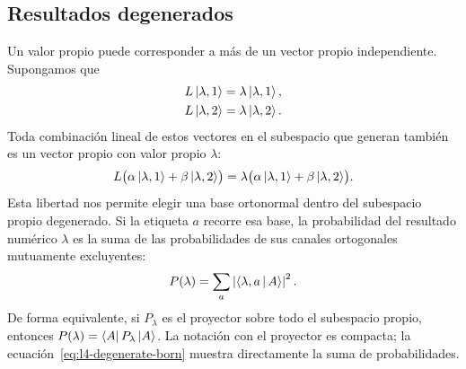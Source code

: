 \begin{classroomqa}
\end{classroomqa}

\begin{classroomqa}
\end{classroomqa}

\subsection{Resultados degenerados}

Un valor propio puede corresponder a más de un vector propio independiente. Supongamos que
\begin{align}
L\left\lvert\lambda,1\right\rangle&=\lambda\left\lvert\lambda,1\right\rangle,\\
L\left\lvert\lambda,2\right\rangle&=\lambda\left\lvert\lambda,2\right\rangle.
\end{align}
Toda combinación lineal de estos vectores en el subespacio que generan también es un vector propio con valor propio \(\lambda\):
\begin{equation}
L\bigl(\alpha\left\lvert\lambda,1\right\rangle+\beta\left\lvert\lambda,2\right\rangle\bigr)
=
\lambda\bigl(\alpha\left\lvert\lambda,1\right\rangle+\beta\left\lvert\lambda,2\right\rangle\bigr).
\end{equation}
Esta libertad nos permite elegir una base ortonormal dentro del subespacio propio degenerado. Si la etiqueta \(a\) recorre esa base, la probabilidad del resultado numérico \(\lambda\) es la suma de las probabilidades de sus canales ortogonales mutuamente excluyentes:
\begin{equation}
P(\lambda)=\sum_a\left|\left\langle\lambda,a\,\middle|\,A\right\rangle\right|^2.
\label{eq:l4-degenerate-born}
\end{equation}
De forma equivalente, si \(P_\lambda\) es el proyector sobre todo el subespacio propio, entonces \(P(\lambda)=\left\langle A\right\rvert P_\lambda\left\lvert A\right\rangle\). La notación con el proyector es compacta; la ecuación~\eqref{eq:l4-degenerate-born} muestra directamente la suma de probabilidades.

